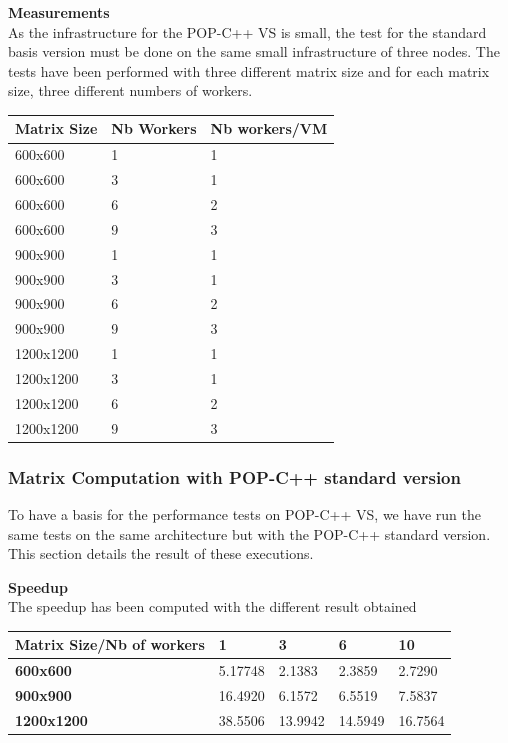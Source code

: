 \textbf{Measurements}\\
As the infrastructure for the POP-C++ VS is small, the test for the standard basis version must be done on the same small infrastructure of three nodes. The tests have been performed with three different matrix size and for each matrix size, three different numbers of workers.
\begin{center}
\begin{tabular}{|p{3cm}|p{3cm}|p{3cm}|}
\hline
\textbf{Matrix Size} & \textbf{Nb Workers}	& \textbf{Nb workers/VM} \\ \hline
600x600 & 1 & 1\\ \hline
600x600 & 3 & 1\\ \hline
600x600 & 6 & 2\\ \hline
600x600 & 9 & 3\\ \hline
900x900 & 1 & 1\\ \hline
900x900 & 3 & 1\\ \hline
900x900 & 6 & 2\\ \hline
900x900 & 9 & 3\\ \hline
1200x1200 & 1 & 1\\ \hline
1200x1200 & 3 & 1\\ \hline
1200x1200 & 6 & 2\\ \hline
1200x1200 & 9 & 3\\ \hline
\end{tabular}
\end{center}\s


\subsubsection{Matrix Computation with POP-C++ standard version}
To have a basis for the performance tests on POP-C++ VS, we have run the same tests on the same architecture but with the POP-C++ standard version. This section details the result of these executions. \s

\textbf{Speedup}\\
The speedup has been computed with the different result obtained 
\begin{center}
\begin{tabular}{|p{6cm}|p{2cm}|p{2cm}|p{2cm}|p{2cm}|}
\hline
\textbf{Matrix Size/Nb of workers} & \textbf{1}	& \textbf{3} 	& \textbf{6}	& \textbf{10}\\ \hline
\textbf{600x600} &5.17748 & 2.1383 &	2.3859	& 2.7290 \\ \hline
\textbf{900x900} &16.4920&	6.1572&	6.5519	&7.5837\\ \hline
\textbf{1200x1200} &38.5506 & 13.9942	 & 14.5949 & 16.7564\\ \hline

\end{tabular}
\end{center}\s

